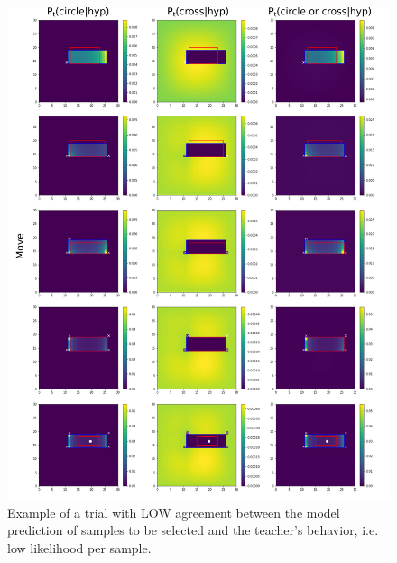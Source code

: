 \documentclass[a4paper,10pt]{article}
\begin{document}
\begin{figure}
    \centering
    \includegraphics[width=6.0in]{figures/low_likelihood_per_sample.pdf}
    \caption{Example of a trial with LOW agreement between the model prediction of samples to be selected and the teacher's behavior, i.e. low likelihood per sample.}
    \label{}
\end{figure}
\end{document}
